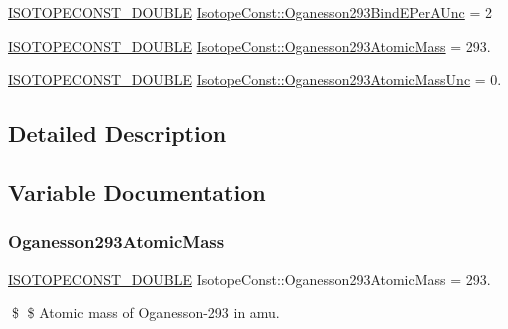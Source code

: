 \begin{DoxyCompactItemize}
\mbox{\hyperlink{group___isotope_const-_macros_ga8f45a7272ce02c0b4c65c44636ed719a}{I\+S\+O\+T\+O\+P\+E\+C\+O\+N\+S\+T\+\_\+\+D\+O\+U\+B\+LE}} \mbox{\hyperlink{group___isotope_const-_oganesson-_og293_ga229aea630fb1e003554ce542f20b1d3d}{Isotope\+Const\+::\+Oganesson293\+Bind\+E\+Per\+A\+Unc}} = 2
\item 
\mbox{\hyperlink{group___isotope_const-_macros_ga8f45a7272ce02c0b4c65c44636ed719a}{I\+S\+O\+T\+O\+P\+E\+C\+O\+N\+S\+T\+\_\+\+D\+O\+U\+B\+LE}} \mbox{\hyperlink{group___isotope_const-_oganesson-_og293_gaec2558308c2512ab0037f5474b9b0b18}{Isotope\+Const\+::\+Oganesson293\+Atomic\+Mass}} = 293.
\item 
\mbox{\hyperlink{group___isotope_const-_macros_ga8f45a7272ce02c0b4c65c44636ed719a}{I\+S\+O\+T\+O\+P\+E\+C\+O\+N\+S\+T\+\_\+\+D\+O\+U\+B\+LE}} \mbox{\hyperlink{group___isotope_const-_oganesson-_og293_ga0f552dd22371df5fb19c8362e7e7a4b8}{Isotope\+Const\+::\+Oganesson293\+Atomic\+Mass\+Unc}} = 0.
\end{DoxyCompactItemize}


\subsection{Detailed Description}


\subsection{Variable Documentation}
\mbox{\label{group___isotope_const-_oganesson-_og293_gaec2558308c2512ab0037f5474b9b0b18}} 
\subsubsection{\texorpdfstring{Oganesson293\+Atomic\+Mass}{Oganesson293AtomicMass}}
{\footnotesize\ttfamily \mbox{\hyperlink{group___isotope_const-_macros_ga8f45a7272ce02c0b4c65c44636ed719a}{I\+S\+O\+T\+O\+P\+E\+C\+O\+N\+S\+T\+\_\+\+D\+O\+U\+B\+LE}} Isotope\+Const\+::\+Oganesson293\+Atomic\+Mass = 293.}

\$ \$ Atomic mass of Oganesson-\/293 in amu. \mbox{\label{group___isotope_const-_oganesson-_og293_ga0f552dd22371df5fb19c8362e7e7a4b8}} 

